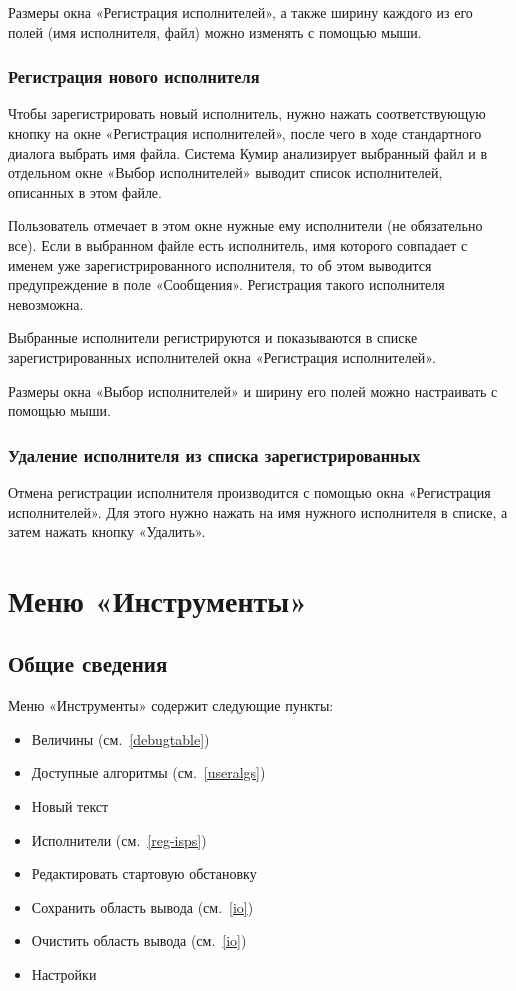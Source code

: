 \documentclass[12pt,a4paper]{article}
\begin{document}
Размеры окна «Регистрация исполнителей», а также ширину каждого из его полей (имя исполнителя, файл) можно изменять с помощью мыши.

\subsubsection{Регистрация нового исполнителя}

Чтобы зарегистрировать новый исполнитель, нужно нажать соответствующую кнопку на окне «Регистрация исполнителей», после чего в ходе стандартного диалога выбрать имя файла. Система Кумир анализирует выбранный файл и в отдельном окне «Выбор исполнителей» выводит список исполнителей, описанных в этом файле.

Пользователь отмечает в этом окне нужные ему исполнители (не обязательно все). Если в выбранном файле есть исполнитель, имя которого совпадает с именем уже зарегистрированного исполнителя, то об этом выводится предупреждение в поле «Сообщения». Регистрация такого исполнителя невозможна.

Выбранные исполнители регистрируются и показываются в списке зарегистрированных исполнителей окна «Регистрация исполнителей».

Размеры окна «Выбор исполнителей» и ширину его полей можно настраивать с помощью мыши. 

\subsubsection{Удаление исполнителя из списка зарегистрированных}

Отмена регистрации исполнителя производится с помощью окна «Регистрация исполнителей». Для этого нужно нажать на имя нужного исполнителя в списке, а затем нажать кнопку «Удалить».

\section{Меню «Инструменты»}
\label{tools}

\subsection{Общие сведения}

Меню «Инструменты» содержит следующие пункты:
\begin{itemize}
\item	Величины (см.~\ref{debugtable})
\item	Доступные алгоритмы (см.~\ref{useralgs})
\item	Новый текст
\item	Исполнители (см.~\ref{reg-isps})
\item	Редактировать стартовую обстановку
\item	Сохранить область вывода (см.~\ref{io})
\item	Очистить область вывода (см.~\ref{io})
\item	Настройки
\end{itemize}
\end{document}
